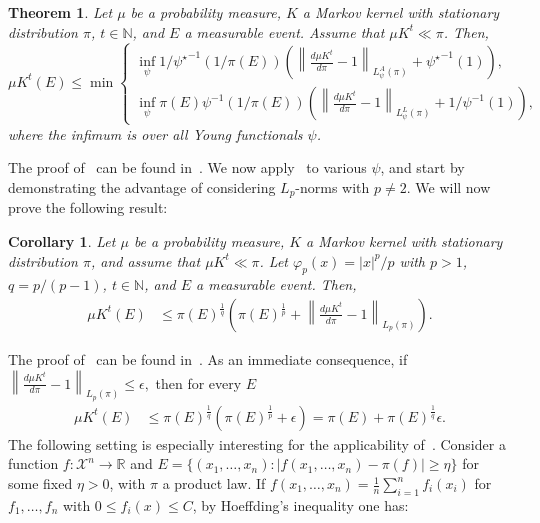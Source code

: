 \documentclass[11pt]{article}
\theoremstyle{plain}
\newtheorem{theorem}{Theorem}[section]
\newtheorem{corollary}{Corollary}[section]
\theoremstyle{remark}
\begin{document}
    \begin{theorem}\label{thm:probBoundPsiNorm}
     Let $\mu$ be a probability measure, $K$ a Markov kernel with stationary distribution $\pi$, $t\in\mathbb{N}$, and $E$ a measurable event. Assume that $\mu K^t\ll\pi$. Then,
    \begin{equation}
            \mu K^t(E) \leq \min \begin{cases}
               \inf_{\psi} 1/{\psi^\star}^{-1}(1/\pi(E))\left(\left\lVert \frac{d\mu K^t}{d\pi}-1\right\rVert_{L_\psi^A(\pi)}+{\psi^\star}^{-1}(1)\right), \\
                   \inf_{\psi}\pi(E)\psi^{-1}(1/\pi(E))\left(\left\lVert \frac{d\mu K^t}{d\pi}-1\right\rVert_{L_\psi^L(\pi)}+1/\psi^{-1}(1)\right),
            \end{cases}
        \end{equation}
        where the infimum is over all Young functionals $\psi$.
    \end{theorem}
    The proof of~ can be found in~.
    We now apply~ to various $\psi$, and start by
demonstrating the advantage of considering $L_p$-norms with $p\neq 2$. We will now prove the following result: 
\begin{corollary}\label{thm:probBoundAlphaNorms}
    Let $\mu$ be a probability measure, $K$ a Markov kernel with stationary distribution $\pi$, and assume that $\mu K^t\ll\pi$. Let $\varphi_p(x)=|x|^p/p$ with $p>1$, $q=p/(p-1)$, $t\in\mathbb{N}$, and $E$ a measurable event. Then,
    \begin{align}
        \mu K^t(E) &\leq \pi(E)^{\frac1q}\left(\pi(E)^\frac1p + \left\lVert \frac{d\mu K^t}{d \pi}-1\right\rVert_{L_p(\pi)}\right).\label{eq:newResultHalpha}
    \end{align}
\end{corollary} 
The proof of~ can be found in~.
As an immediate consequence, if 
$\left\lVert \frac{d\mu K^t}{d\pi}-1\right \rVert_{L_p(\pi)}\leq  \epsilon,$
then for every %
$E$
 \begin{align}\label{eq:ubLp}
    \mu K^t(E) &\leq \pi(E)^\frac1q\left(\pi(E)^\frac1p + \epsilon \right) = \pi(E) + \pi(E)^\frac1q \epsilon. 
\end{align}
The following setting is especially interesting for the applicability of~. Consider a function $f:\mathcal{X}^n\to\mathbb{R}$ and $E=\{(x_1, \ldots, x_n): |f(x_1, \ldots, x_n)-\pi(f)|\geq \eta \}$ for some fixed $\eta>0$, with $\pi$ a product law. If $f(x_1, \ldots, x_n)=\frac1n \sum_{i=1}^n f_i(x_i)$ for $f_1,\ldots,f_n$ with $0\leq f_i(x) \leq C$, by Hoeffding's inequality one has:%
\end{document}
